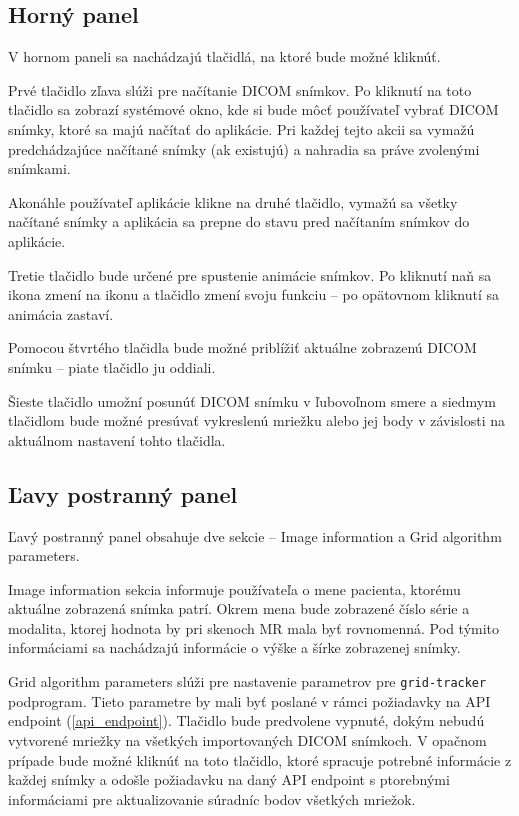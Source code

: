 \subsection {Horný panel}
V hornom paneli sa nachádzajú tlačidlá, na ktoré bude možné kliknúť.

Prvé tlačidlo zľava slúži pre načítanie DICOM snímkov. Po kliknutí na toto tlačidlo sa zobrazí systémové okno, kde si bude môcť používateľ vybrať DICOM snímky, ktoré sa majú načítať do aplikácie. Pri každej tejto akcii sa vymažú predchádzajúce načítané snímky (ak existujú) a nahradia sa práve zvolenými snímkami.

Akonáhle používateľ aplikácie klikne na druhé tlačidlo, vymažú sa všetky načítané snímky a aplikácia sa prepne do stavu pred načítaním snímkov do aplikácie.

Tretie tlačidlo bude určené pre spustenie animácie snímkov. Po kliknutí naň sa ikona zmení na  ikonu a tlačidlo zmení svoju funkciu -- po opätovnom kliknutí sa animácia zastaví.

Pomocou štvrtého tlačidla bude možné priblížiť aktuálne zobrazenú DICOM snímku -- piate tlačidlo ju oddiali.

Šieste tlačidlo umožní posunúť DICOM snímku v ľubovoľnom smere a siedmym tlačidlom bude možné presúvať vykreslenú mriežku alebo jej body v závislosti na aktuálnom nastavení tohto tlačidla.

\subsection {Ľavy postranný panel}
Ľavý postranný panel obsahuje dve sekcie -- Image information a Grid algorithm parameters.

Image information sekcia informuje používateľa o mene pacienta, ktorému aktuálne zobrazená snímka patrí. Okrem mena bude zobrazené číslo série a modalita, ktorej hodnota by pri skenoch MR mala byť rovnomenná. Pod týmito informáciami sa nachádzajú informácie o výške a šírke zobrazenej snímky.

Grid algorithm parameters slúži pre nastavenie parametrov pre \texttt{grid-tracker} podprogram. Tieto parametre by mali byť poslané v rámci požiadavky na API endpoint (\ref{api_endpoint}). Tlačidlo  bude predvolene vypnuté, dokým nebudú vytvorené mriežky na všetkých importovaných DICOM snímkoch. V opačnom prípade bude možné kliknúť na toto tlačidlo, ktoré spracuje potrebné informácie z každej snímky a odošle požiadavku na daný API endpoint s ptorebnými informáciami pre aktualizovanie súradníc bodov všetkých mriežok.

